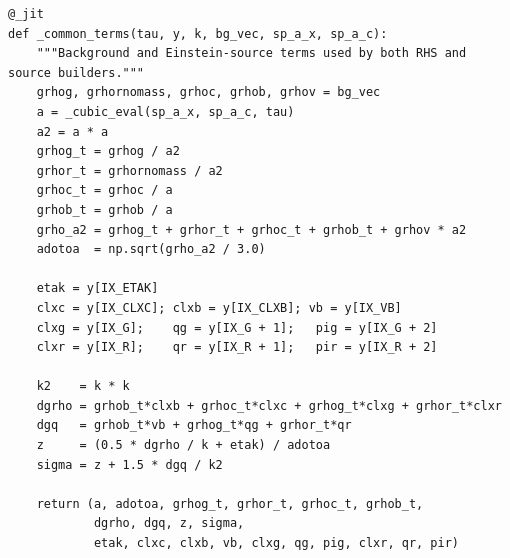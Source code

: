 \begin{codebox}
\begin{lstlisting}[style=python]
@_jit
def _common_terms(tau, y, k, bg_vec, sp_a_x, sp_a_c):
    """Background and Einstein-source terms used by both RHS and source builders."""
    grhog, grhornomass, grhoc, grhob, grhov = bg_vec
    a = _cubic_eval(sp_a_x, sp_a_c, tau)
    a2 = a * a
    grhog_t = grhog / a2
    grhor_t = grhornomass / a2
    grhoc_t = grhoc / a
    grhob_t = grhob / a
    grho_a2 = grhog_t + grhor_t + grhoc_t + grhob_t + grhov * a2
    adotoa  = np.sqrt(grho_a2 / 3.0)

    etak = y[IX_ETAK]
    clxc = y[IX_CLXC]; clxb = y[IX_CLXB]; vb = y[IX_VB]
    clxg = y[IX_G];    qg = y[IX_G + 1];   pig = y[IX_G + 2]
    clxr = y[IX_R];    qr = y[IX_R + 1];   pir = y[IX_R + 2]

    k2    = k * k
    dgrho = grhob_t*clxb + grhoc_t*clxc + grhog_t*clxg + grhor_t*clxr
    dgq   = grhob_t*vb + grhog_t*qg + grhor_t*qr
    z     = (0.5 * dgrho / k + etak) / adotoa
    sigma = z + 1.5 * dgq / k2

    return (a, adotoa, grhog_t, grhor_t, grhoc_t, grhob_t,
            dgrho, dgq, z, sigma,
            etak, clxc, clxb, vb, clxg, qg, pig, clxr, qr, pir)
\end{lstlisting}
\end{codebox}

